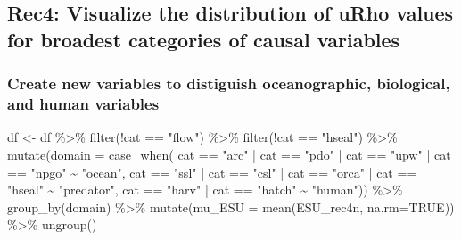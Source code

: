\documentclass[
]{article}
\newenvironment{Shaded}{\begin{snugshade}}{\end{snugshade}}
\newcommand{\AttributeTok}[1]{\textcolor[rgb]{0.77,0.63,0.00}{#1}}
\newcommand{\ConstantTok}[1]{\textcolor[rgb]{0.00,0.00,0.00}{#1}}
\newcommand{\FunctionTok}[1]{\textcolor[rgb]{0.00,0.00,0.00}{#1}}
\newcommand{\NormalTok}[1]{#1}
\newcommand{\OtherTok}[1]{\textcolor[rgb]{0.56,0.35,0.01}{#1}}
\newcommand{\SpecialCharTok}[1]{\textcolor[rgb]{0.00,0.00,0.00}{#1}}
\newcommand{\StringTok}[1]{\textcolor[rgb]{0.31,0.60,0.02}{#1}}
\begin{document}
\hypertarget{rec4-visualize-the-distribution-of-urho-values-for-broadest-categories-of-causal-variables}{%
\subsection{Rec4: Visualize the distribution of uRho values for broadest
categories of causal
variables}\label{rec4-visualize-the-distribution-of-urho-values-for-broadest-categories-of-causal-variables}}

\hypertarget{create-new-variables-to-distiguish-oceanographic-biological-and-human-variables}{%
\subsubsection{Create new variables to distiguish oceanographic,
biological, and human
variables}\label{create-new-variables-to-distiguish-oceanographic-biological-and-human-variables}}

\begin{Shaded}
\begin{Highlighting}[]
\NormalTok{df }\OtherTok{\textless{}{-}}\NormalTok{ df }\SpecialCharTok{\%\textgreater{}\%} 
  \FunctionTok{filter}\NormalTok{(}\SpecialCharTok{!}\NormalTok{cat }\SpecialCharTok{==} \StringTok{"flow"}\NormalTok{) }\SpecialCharTok{\%\textgreater{}\%} 
  \FunctionTok{filter}\NormalTok{(}\SpecialCharTok{!}\NormalTok{cat }\SpecialCharTok{==} \StringTok{"hseal"}\NormalTok{) }\SpecialCharTok{\%\textgreater{}\%} 
  \FunctionTok{mutate}\NormalTok{(}\AttributeTok{domain =} \FunctionTok{case\_when}\NormalTok{(}
\NormalTok{    cat }\SpecialCharTok{==} \StringTok{"arc"} \SpecialCharTok{|}\NormalTok{ cat }\SpecialCharTok{==} \StringTok{"pdo"} \SpecialCharTok{|}\NormalTok{ cat }\SpecialCharTok{==} \StringTok{"upw"} \SpecialCharTok{|}\NormalTok{ cat }\SpecialCharTok{==} \StringTok{"npgo"} \SpecialCharTok{\textasciitilde{}} \StringTok{"ocean"}\NormalTok{, }
\NormalTok{    cat }\SpecialCharTok{==} \StringTok{"ssl"} \SpecialCharTok{|}\NormalTok{ cat }\SpecialCharTok{==} \StringTok{"csl"} \SpecialCharTok{|}\NormalTok{ cat }\SpecialCharTok{==} \StringTok{"orca"} \SpecialCharTok{|}\NormalTok{ cat }\SpecialCharTok{==} \StringTok{"hseal"} \SpecialCharTok{\textasciitilde{}} \StringTok{"predator"}\NormalTok{, }
\NormalTok{    cat }\SpecialCharTok{==} \StringTok{"harv"} \SpecialCharTok{|}\NormalTok{ cat }\SpecialCharTok{==} \StringTok{"hatch"} \SpecialCharTok{\textasciitilde{}} \StringTok{"human"}\NormalTok{)) }\SpecialCharTok{\%\textgreater{}\%} 
  \FunctionTok{group\_by}\NormalTok{(domain) }\SpecialCharTok{\%\textgreater{}\%} 
  \FunctionTok{mutate}\NormalTok{(}\AttributeTok{mu\_ESU =} \FunctionTok{mean}\NormalTok{(ESU\_rec4n, }\AttributeTok{na.rm=}\ConstantTok{TRUE}\NormalTok{)) }\SpecialCharTok{\%\textgreater{}\%}
  \FunctionTok{ungroup}\NormalTok{()}
\end{Highlighting}
\end{Shaded}
\end{document}
